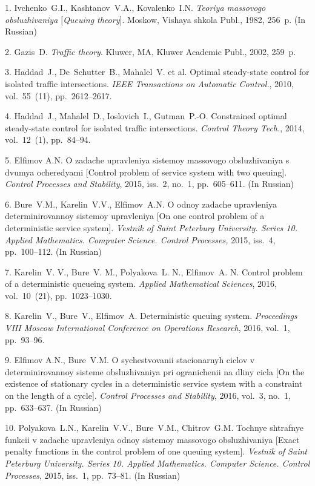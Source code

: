{\footnotesize

\vskip 4mm


\vskip 3mm


1.    Ivchenko~G.\:I., Kashtanov~V.\:A., Kovalenko~I.\:N. {\it
Teoriya massovogo obsluzhivaniya $[$Queuing theory$]$}. Moskow,
Vishaya shkola Publ., 1982, 256~p. (In Russian)

2. Gazis~D. {\it Traffic theory}. Kluwer, MA, Kluwer Academic
Publ., 2002, 259~p.


3.   Haddad~J., De~Schutter~B., Mahalel~V. et al.    Optimal
steady-state control for isolated traffic intersections.  {\it
IEEE Transactions on Automatic Control.}, 2010, vol.~55~(11),
pp.~2612--2617.

4.    Haddad~J., Mahalel~D., Ioslovich~I., Gutman~P.-O.
Constrained optimal steady-state control for isolated traffic
intersections. {\it  Control Theory Tech.}, 2014, vol.~12~(1),
pp.~84--94.

5.   Elfimov A.\:N.  O zadache upravleniya sistemoy massovogo
obsluzhivaniya s dvumya ocheredyami [Control problem of service
system with two queuing]. {\it  Control Processes and Stability},
2015, iss.~2, no.~1, pp.~605--611. (In Russian)

6.     Bure~V.\:M., Karelin~V.\:V., Elfimov~A.\:N.  O odnoy
zadache upravleniya determinirovannoy sistemoy upravleniya [On one
control problem of a deterministic service system]. {\it  Vestnik
of Saint Peterburg University. Series 10. Applied Mathematics.
Computer Science. Control Processes,} 2015, iss.~4, pp.~100--112.
(In Russian)

7.   Karelin~V. V., Bure~V. M., Polyakova~L. N., Elfimov~A. N.
Control problem of a deterministic queueing system. {\it  Applied
Mathematical Sciences}, 2016, vol.~10~(21), pp.~1023--1030.

8.   Karelin~V., Bure~V., Elfimov~A. Deterministic queuing system.
{\it Proceedings VIII Moscow International Conference on
Operations Research}, 2016,  vol.~1, pp.~93--96.

9.   Elfimov A.\:N., Bure~V.\:M. O sychestvovanii stacionarnyh
ciclov v determinirovannoy sisteme obsluzhivaniya pri ogranichenii
na dliny cicla [On the existence of stationary cycles in a
deterministic service system with a constraint on the length of a
cycle]. {\it  Control Processes and Stability}, 2016, vol.~3,
no.~1, pp.~633--637. (In Russian)

10.    Polyakova~L.\:N., Karelin~V.\:V., Bure~V.\:M.,
Chitrov~G.\:M.  Tochnye shtrafnye funkcii v zadache upravleniya
odnoy sistemoy massovogo obsluzhivaniya  [Exact penalty functions
in the control problem of one queuing system]. {\it  Vestnik of
Saint Peterburg University. Series 10. Applied Mathematics.
Computer Science. Control Processes}, 2015, iss.~1, pp.~73--81.
(In Russian)


}
